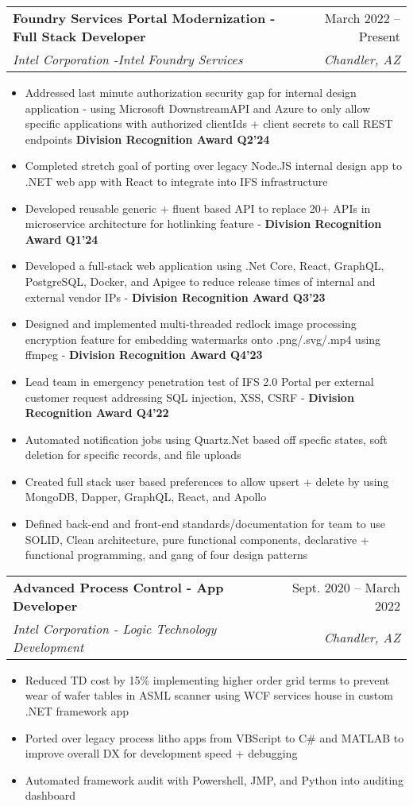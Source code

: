 \documentclass[letterpaper,11pt]{article}
\makeatletter
\newcommand{\resumeItem}[1]{
  \item\small{
    {#1 \vspace{-2pt}}
  }
}
\newcommand{\resumeSubheading}[4]{
  \vspace{-2pt}\item
    \begin{tabular*}{0.97\textwidth}[t]{l@{\extracolsep{\fill}}r}
      \textbf{#1} & #2 \\
      \textit{\small#3} & \textit{\small #4} \\
    \end{tabular*}\vspace{-7pt}
}
\newcommand{\resumeItemListStart}{\begin{itemize}}
\newcommand{\resumeItemListEnd}{\end{itemize}\vspace{-5pt}}
\makeatother
\begin{document}
    \resumeSubheading
      {Foundry Services Portal Modernization - Full Stack Developer}{March 2022 -- Present}
      {Intel Corporation -Intel Foundry Services}{Chandler, AZ}
      \resumeItemListStart
        \resumeItem{Addressed last minute authorization security gap for internal design application - using Microsoft DownstreamAPI and Azure to only allow specific applications with authorized clientIds + client secrets to call REST endpoints \textbf{Division Recognition Award Q2'24}}
        \resumeItem{Completed stretch goal of porting over legacy Node.JS internal design app to .NET web app with React to integrate into IFS infrastructure}
        \resumeItem{Developed reusable generic + fluent based API to replace 20+ APIs in microservice architecture for hotlinking feature - \textbf{Division Recognition Award Q1'24}}
        \resumeItem{Developed a full-stack web application using .Net Core, React, GraphQL, PostgreSQL, Docker, and Apigee to reduce release times of internal and external vendor IPs - \textbf{Division Recognition Award Q3'23}}
        \resumeItem{Designed and implemented multi-threaded redlock image processing encryption feature for embedding watermarks onto .png/.svg/.mp4 using ffmpeg - \textbf{Division Recognition Award Q4'23}}
        \resumeItem{Lead team in emergency penetration test of IFS 2.0 Portal per external customer request addressing SQL injection, XSS, CSRF - \textbf{Division Recognition Award Q4'22}}
        \resumeItem{Automated notification jobs using Quartz.Net based off specfic states, soft deletion for specific records, and file uploads}
        \resumeItem{Created full stack user based preferences to allow upsert + delete by using MongoDB, Dapper, GraphQL, React, and Apollo}
        \resumeItem{Defined back-end and front-end standards/documentation for team to use SOLID, Clean architecture, pure functional components, declarative + functional programming, and gang of four design patterns} 
      \resumeItemListEnd
      

    \resumeSubheading
      {Advanced Process Control - App Developer}{Sept. 2020 -- March 2022}
      {Intel Corporation - Logic Technology Development}{Chandler, AZ}
      \resumeItemListStart
        \resumeItem{Reduced TD cost by 15\% implementing higher order grid terms to prevent wear of wafer tables in ASML scanner using WCF services house in custom .NET framework app }
        \resumeItem{Ported over legacy process litho apps from VBScript to C\# and MATLAB to improve overall DX for development speed + debugging}
        \resumeItem{Automated framework audit with Powershell, JMP, and Python into auditing dashboard}
    \resumeItemListEnd
\end{document}
